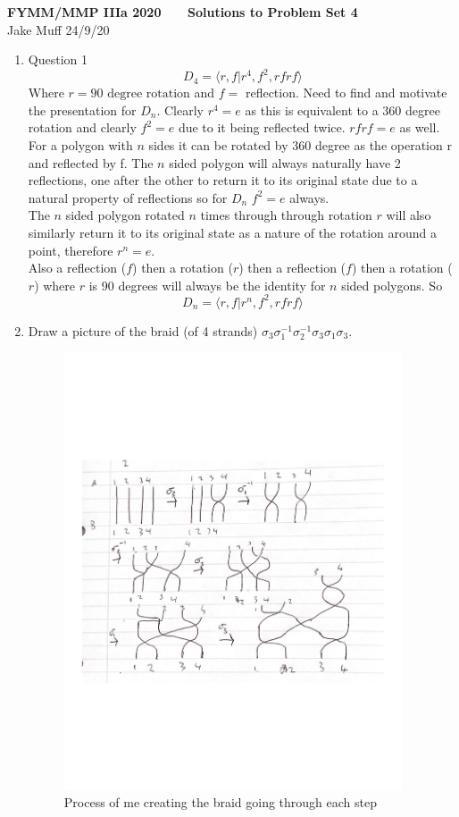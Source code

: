 \documentclass[12pt]{article}
\begin{document}
\normalsize

\baselineskip 14pt

\begin{center}
{\Large {\bf FYMM/MMP IIIa 2020 \ \ \  Solutions to Problem Set 4}}
\\
Jake Muff
24/9/20
\end{center}

\bigskip



\begin{enumerate}
\item Question 1
$$ D_4 = \langle r,f | r^4 ,f^2, rfrf \rangle $$
Where $r = 90 \text{ degree rotation}$ and $f = $ reflection. Need to find and motivate the presentation for $D_n$. Clearly $r^4 = e$ as this is equivalent to a 360 degree rotation and clearly $f^2 = e $ due to it being reflected twice. $rfrf = e$ as well. 
\\
For a polygon with $n$ sides it can be rotated by 360 degree as the operation r and reflected by f. The $n$ sided polygon will always naturally have 2 reflections, one after the other to return it to its original state due to a natural property of reflections so for $D_n$ $f^2 = e$ always. 
\\
The $n$ sided polygon rotated $n$ times through through rotation $r$ will also similarly return it to its original state as a nature of the rotation around a point, therefore $r^n = e $. 
\\
Also a reflection ($f$) then a rotation ($r$) then a reflection ($f$) then a rotation ($r$) where $r$ is 90 degrees will always be the identity for $n$ sided polygons. So
$$ D_n = \langle r,f | r^n, f^2, rfrf \rangle $$ 
\item Draw a picture of the braid (of 4 strands) $\sigma_3\sigma^{-1}_1\sigma^{-1}_2\sigma_3\sigma_1\sigma_3$.
\\
\begin{figure}[h]
  \includegraphics[width=10cm]{Braids.jpg}
  \centering 
  \caption{Process of me creating the braid going through each step}


\end{figure}
\end{enumerate}
\end{document}
